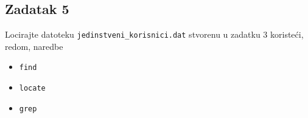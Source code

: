 \documentclass[12pt,a4paper]{article}
\begin{document}
  \subsection*{Zadatak 5}
  Locirajte datoteku \texttt{jedinstveni\_korisnici.dat} stvorenu u zadatku 3 koristeći, redom, naredbe
  \begin{itemize}
    \item \texttt{find}
    \item \texttt{locate}
    \item \texttt{grep}
  \end{itemize}
\end{document}
